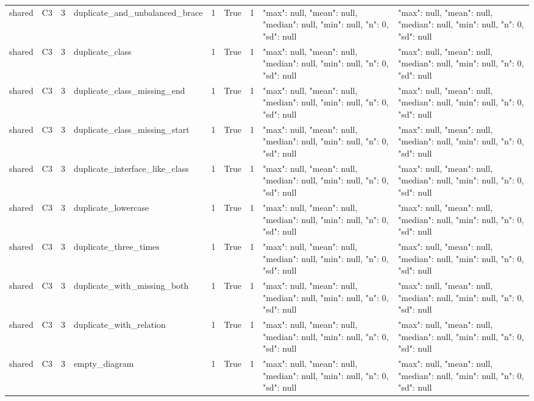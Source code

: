 \begin{tabular}{lllllllll}
shared & C3 & 3 & duplicate\_and\_unbalanced\_brace & 1 & True & 1 & {"max": null, "mean": null, "median": null, "min": null, "n": 0, "sd": null} & {"max": null, "mean": null, "median": null, "min": null, "n": 0, "sd": null} \\
shared & C3 & 3 & duplicate\_class & 1 & True & 1 & {"max": null, "mean": null, "median": null, "min": null, "n": 0, "sd": null} & {"max": null, "mean": null, "median": null, "min": null, "n": 0, "sd": null} \\
shared & C3 & 3 & duplicate\_class\_missing\_end & 1 & True & 1 & {"max": null, "mean": null, "median": null, "min": null, "n": 0, "sd": null} & {"max": null, "mean": null, "median": null, "min": null, "n": 0, "sd": null} \\
shared & C3 & 3 & duplicate\_class\_missing\_start & 1 & True & 1 & {"max": null, "mean": null, "median": null, "min": null, "n": 0, "sd": null} & {"max": null, "mean": null, "median": null, "min": null, "n": 0, "sd": null} \\
shared & C3 & 3 & duplicate\_interface\_like\_class & 1 & True & 1 & {"max": null, "mean": null, "median": null, "min": null, "n": 0, "sd": null} & {"max": null, "mean": null, "median": null, "min": null, "n": 0, "sd": null} \\
shared & C3 & 3 & duplicate\_lowercase & 1 & True & 1 & {"max": null, "mean": null, "median": null, "min": null, "n": 0, "sd": null} & {"max": null, "mean": null, "median": null, "min": null, "n": 0, "sd": null} \\
shared & C3 & 3 & duplicate\_three\_times & 1 & True & 1 & {"max": null, "mean": null, "median": null, "min": null, "n": 0, "sd": null} & {"max": null, "mean": null, "median": null, "min": null, "n": 0, "sd": null} \\
shared & C3 & 3 & duplicate\_with\_missing\_both & 1 & True & 1 & {"max": null, "mean": null, "median": null, "min": null, "n": 0, "sd": null} & {"max": null, "mean": null, "median": null, "min": null, "n": 0, "sd": null} \\
shared & C3 & 3 & duplicate\_with\_relation & 1 & True & 1 & {"max": null, "mean": null, "median": null, "min": null, "n": 0, "sd": null} & {"max": null, "mean": null, "median": null, "min": null, "n": 0, "sd": null} \\
shared & C3 & 3 & empty\_diagram & 1 & True & 1 & {"max": null, "mean": null, "median": null, "min": null, "n": 0, "sd": null} & {"max": null, "mean": null, "median": null, "min": null, "n": 0, "sd": null} \\

\end{tabular}
